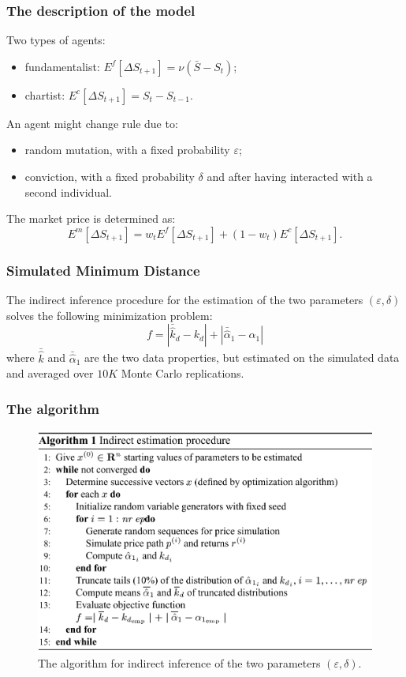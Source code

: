 \documentclass[10pt]{beamer}
\begin{document}
\begin{frame}[c]\frametitle{The description of the model}
    Two types of agents: 
    \begin{itemize}
    	\item fundamentalist: $E^{f}[\Delta S_{t+1}] = \nu (\bar{S} - S_{t})$;
    	\item chartist: $E^{c}[\Delta S_{t+1}] = S_{t} - S_{t-1}$.
    \end{itemize} 

    An agent might change rule due to:
    \begin{itemize}
    	\item random mutation, with a fixed probability $\varepsilon$;
    	\item conviction, with a fixed probability $\delta$ and after having interacted with a second individual.
    \end{itemize}
    
    The market price is determined as:
    \begin{equation}
    	E^{m}[\Delta S_{t+1}] = w_{t} E^{f}[\Delta S_{t+1}] + (1- w_{t}) E^{c}[\Delta S_{t+1}].
    \end{equation}
\end{frame}


\begin{frame}[c]\frametitle{Simulated Minimum Distance}
	The indirect inference procedure for the estimation of the two parameters $(\varepsilon, \delta)$ solves the following minimization problem:
	\begin{equation}
		f = |\bar{\hat{k}}_{d} - k_{d}| + |\bar{\hat{\alpha}}_{1} - \alpha_{1}|
	\end{equation}
	where $\bar{\hat{k}}$ and $\bar{\hat{\alpha}}_{1}$ are the two data properties, but estimated on the simulated data and averaged over $10K$ Monte Carlo replications.
\end{frame}


\begin{frame}[c]\frametitle{The algorithm}
	\begin{figure} \centering
		\includegraphics[scale=.25]{figures/gilli_2001_algorithm.png}
		\caption{The \citet{gilli2001estimation} algorithm for indirect inference of the two parameters $(\varepsilon, \delta)$.}
	\end{figure}
\end{frame}
\end{document}
